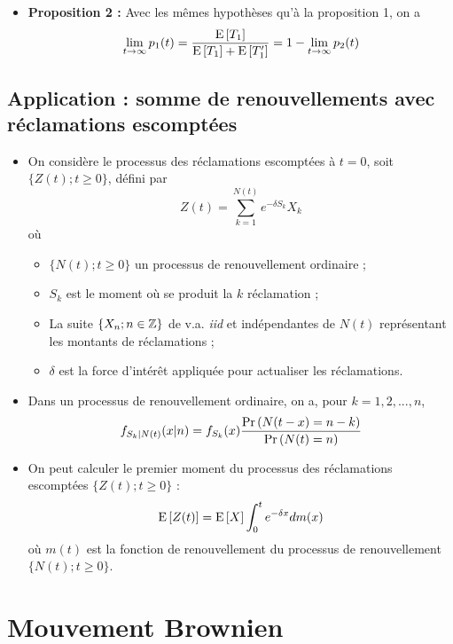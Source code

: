 \documentclass[10pt, french, landscape]{article}
\begin{document}
\begin{multicols*}{2}
\begin{itemize}
\item \textbf{Proposition 2 : } Avec les mêmes hypothèses qu'à la proposition 1, on a
\[\lim_{t \to \infty} p_1(t) = \frac{\mathrm{E} \left[ T_1 \right]}{\mathrm{E} \left[ T_1 \right] + \mathrm{E} \left[ T_1' \right]} = 1 - \lim_{t \to \infty} p_2(t) \]
\end{itemize}

\subsection*{Application : somme de renouvellements avec réclamations escomptées}
\begin{itemize}
\item On considère le processus des réclamations escomptées à $t=0$, soit $\{ Z(t) ; t \geq 0 \}$, défini par
\[Z(t) = \sum_{k=1}^{N(t)} e^{-\delta S_k} X_k  \]
où
\begin{itemize}
	\item $\{N(t) ; t \geq 0 \}$ un processus de renouvellement ordinaire ;
	\item $S_k$ est le moment où se produit la $k$ réclamation ;
	\item La suite $\{ X_n ; n \in \mathbb{Z} \}$ de v.a. \emph{iid} et indépendantes de $N(t)$ représentant les montants de réclamations ;
	\item $\delta$ est la force d'intérêt appliquée pour actualiser les réclamations.
\end{itemize}

\item Dans un processus de renouvellement ordinaire, on a, pour $k = 1, 2, ..., n$,
\begin{align*}
f_{S_k | N(t)}(x | n) = f_{S_k}(x) \frac{\Pr \left( N(t-x) = n-k \right)}{\Pr \left( N(t) = n \right)}
\end{align*}

\item On peut calculer le premier moment du processus des réclamations escomptées $\{ Z(t) ; t \geq 0 \}$ : 
\[\mathrm{E} \left[ Z(t) \right] = \mathrm{E} \left[ X \right] \int_{0}^{t} e^{-\delta x} d m(x) \]
où $m(t)$ est la fonction de renouvellement du processus de renouvellement $\{ N(t) ; t \geq 0 \}$.
\end{itemize}

\section{Mouvement Brownien}

\end{multicols*}
\end{document}
